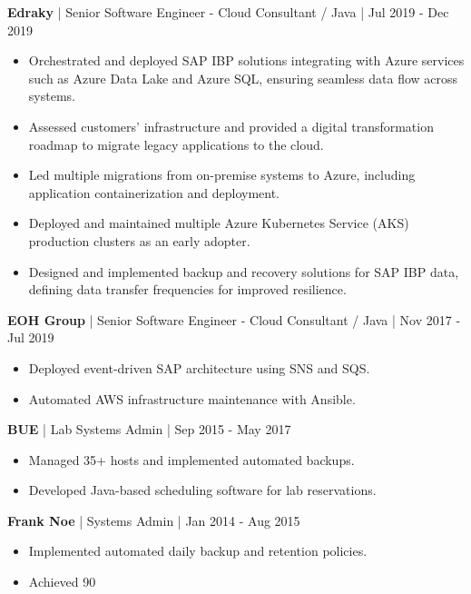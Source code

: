 \documentclass{resume} %
\begin{document}
\textbf{Edraky} | Senior Software Engineer - Cloud Consultant / Java | Jul 2019 - Dec 2019
\begin{itemize}
    \item Orchestrated and deployed SAP IBP solutions integrating with Azure services such as Azure Data Lake and Azure SQL, ensuring seamless data flow across systems.
    \item Assessed customers' infrastructure and provided a digital transformation roadmap to migrate legacy applications to the cloud.
    \item Led multiple migrations from on-premise systems to Azure, including application containerization and deployment.
    \item Deployed and maintained multiple Azure Kubernetes Service (AKS) production clusters as an early adopter.
    \item Designed and implemented backup and recovery solutions for SAP IBP data, defining data transfer frequencies for improved resilience.
\end{itemize}

\textbf{EOH Group} | Senior Software Engineer - Cloud Consultant / Java | Nov 2017 - Jul 2019
\begin{itemize}
    \item Deployed event-driven SAP architecture using SNS and SQS.
    \item Automated AWS infrastructure maintenance with Ansible.
\end{itemize}

\textbf{BUE} | Lab Systems Admin | Sep 2015 - May 2017
\begin{itemize}
    \item Managed 35+ hosts and implemented automated backups.
    \item Developed Java-based scheduling software for lab reservations.
\end{itemize}

\textbf{Frank Noe} | Systems Admin | Jan 2014 - Aug 2015
\begin{itemize}
    \item Implemented automated daily backup and retention policies.
    \item Achieved 90%
\end{itemize}
\end{document}
